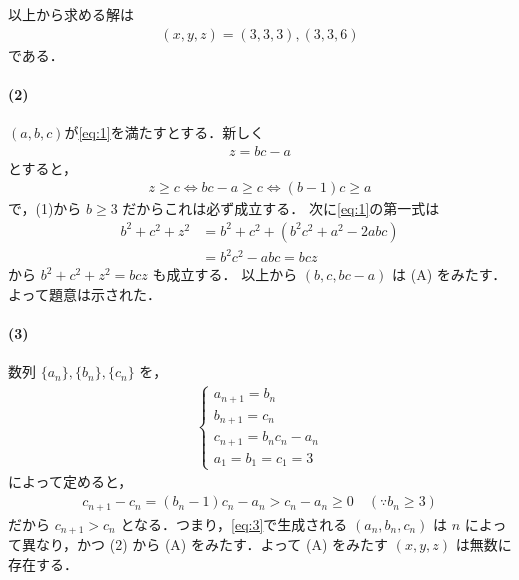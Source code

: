 \documentclass[../../main.tex]{subfiles}
\begin{document}
以上から求める解は
\begin{align}
  (x, y, z) = (3, 3, 3), (3, 3, 6)
\end{align}
である．

\paragraph{(2)}

$(a,b,c)$が\cref{eq:1}を満たすとする．新しく
\begin{align}
  z = bc-a \label{eq:2}
\end{align}
とすると，
\begin{align}
  z \ge c \iff bc - a \ge c \iff (b - 1)c \ge a
\end{align}
で，(1)から $b \ge 3$ だからこれは必ず成立する．
次に\cref{eq:1}の第一式は
\begin{align}
  b^2 + c^2 + z^2 &= b^2 + c^2 + (b^2c^2 + a^2 - 2abc) \\
  &= b^2c^2 - abc = bcz
\end{align}
から $b^2 + c^2 + z^2 = bcz$ も成立する．
以上から $(b, c, bc - a)$ は (A) をみたす．よって題意は示された．

\paragraph{(3)}

数列 $\{a_n\}, \{b_n\}, \{c_n\}$ を，
\begin{align}
  \begin{cases}
    a_{n+1} = b_n \\
    b_{n+1} = c_n \\
    c_{n+1} = b_n c_n - a_n \\
    a_1 = b_1 = c_1 = 3
  \end{cases} \label{eq:3}
\end{align}
によって定めると，
\begin{align}
  c_{n+1} - c_n = (b_n - 1)c_n - a_n > c_n - a_n \ge 0 \quad (\because b_n \ge 3)
\end{align}
だから $c_{n+1} > c_n$ となる．つまり，\cref{eq:3}で生成される $(a_n, b_n, c_n)$ は $n$ によって異なり，かつ (2) から (A) をみたす．よって (A) をみたす $(x, y, z)$ は無数に存在する．
\end{document}
